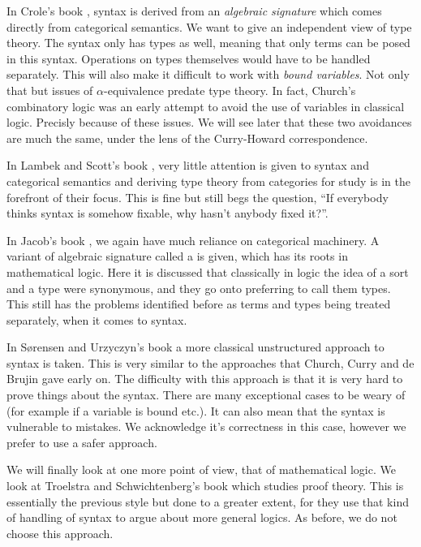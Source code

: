 In Crole's book \cite{CroleRoyL1993Cft}, syntax is derived from an \textit{algebraic signature} which comes directly from categorical semantics. We want to give an independent view of type theory. The syntax only has types as well, meaning that only terms can be posed in this syntax. Operations on types themselves would have to be handled separately. This will also make it difficult to work with \textit{bound variables}. Not only that but issues of $\alpha$-equivalence predate type theory. In fact, Church's combinatory logic \cite{church1932} was an early attempt to avoid the use of variables in classical logic. Precisly because of these issues. We will see later that these two avoidances are much the same, under the lens of the Curry-Howard correspondence. 

In Lambek and Scott's book \cite{LambekJ1986Itho}, very little attention is given to syntax and categorical semantics and deriving type theory from categories for study is in the forefront of their focus. This is fine but still begs the question, ``If everybody thinks syntax is somehow fixable, why hasn't anybody fixed it?''.

In Jacob's book \cite{JacobsCLTT}, we again have much reliance on categorical machinery. A variant of algebraic signature called a  is given, which has its roots in mathematical logic. Here it is discussed that classically in logic the idea of a sort and a type were synonymous, and they go onto preferring to call them types. This still has the problems identified before as terms and types being treated separately, when it comes to syntax.

In S{\o}rensen and Urzyczyn's book \cite{Sorensen} a more classical unstructured approach to syntax is taken. This is very similar to the approaches that Church, Curry and de Brujin gave early on. The difficulty with this approach is that it is very hard to prove things about the syntax. There are many exceptional cases to be weary of (for example if a variable is bound etc.). It can also mean that the syntax is vulnerable to mistakes. We acknowledge it's correctness in this case, however we prefer to use a safer approach.

We will finally look at one more point of view, that of mathematical logic. We look at Troelstra and Schwichtenberg's book \cite{troelstra_schwichtenberg_2000} which studies proof theory. This is essentially the previous style but done to a greater extent, for they use that kind of handling of syntax to argue about more general logics. As before, we do not choose this approach.

